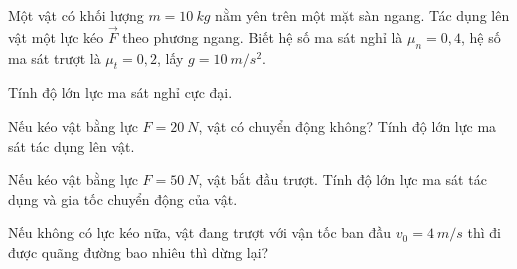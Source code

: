 \begin{vidu}
Một vật có khối lượng $m = 10\ kg$ nằm yên trên một mặt sàn ngang. Tác dụng lên vật một lực kéo $\vec{F}$ theo phương ngang. Biết hệ số ma sát nghỉ là $\mu_n = 0,4$, hệ số ma sát trượt là $\mu_t = 0,2$, lấy $g = 10\ m/s^2$.	\begin{listEX}
\item Tính độ lớn lực ma sát nghỉ cực đại.
\item Nếu kéo vật bằng lực $F = 20\ N$, vật có chuyển động không? Tính độ lớn lực ma sát tác dụng lên vật.
\item Nếu kéo vật bằng lực $F = 50\ N$, vật bắt đầu trượt. Tính độ lớn lực ma sát tác dụng và gia tốc chuyển động của vật.
\item Nếu không có lực kéo nữa, vật đang trượt với vận tốc ban đầu $v_0 = 4\ m/s$ thì đi được quãng đường bao nhiêu thì dừng lại?
\end{listEX}

\end{vidu}

